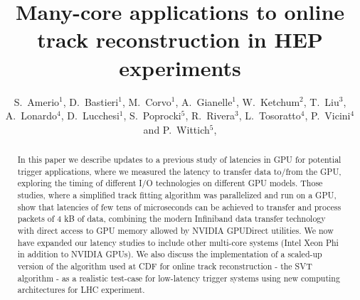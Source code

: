 \documentclass[letterpaper]{jpconf}
\begin{document}
\title{Many-core applications to online track reconstruction in HEP experiments}
\author{S.~Amerio$^1$, 
  D.~Bastieri$^1$, 
  M.~Corvo$^1$, 
  A.~Gianelle$^1$, 
  W.~Ketchum$^2$,
  T.~Liu$^3$, 
  A.~Lonardo$^4$, 
  D.~Lucchesi$^1$,
  S.~Poprocki$^5$, 
  R.~Rivera$^3$, 
  L.~Tosoratto$^4$,
  P.~Vicini$^4$
  and 
  P.~Wittich$^5$,
}
\address{$^1$ INFN and University of Padova, Italy}
\address{$^2$ Los Alamos National Laboratory, New Mexico, USA}
\address{$^3$ Fermi National Accelerator Laboratory, Illinois, USA}
\address{$^4$ INFN Roma, Italy}
\address{$^5$ Cornell University, New York, USA}


\begin{abstract}
  In this paper we describe updates to a previous study of latencies
  in GPU for potential trigger applications, where we measured the
  latency to transfer data to/from the GPU, exploring the timing of
  different I/O technologies on different GPU models.  Those studies,
  where a simplified track fitting algorithm was parallelized and run
  on a GPU, show that latencies of few tens of microseconds can be
  achieved to transfer and process packets of 4 kB of data, combining
  the modern Infiniband data transfer technology with direct access to
  GPU memory allowed by NVIDIA GPUDirect utilities.  We now have
  expanded our latency studies to include other multi-core systems
  (Intel Xeon Phi in addition to NVIDIA GPUs). We also discuss the
  implementation of a scaled-up version of the algorithm used at CDF
  for online track reconstruction - the SVT algorithm - as a realistic
  test-case for low-latency trigger systems using new computing
  architectures for LHC experiment.

\end{abstract}
\end{document}
